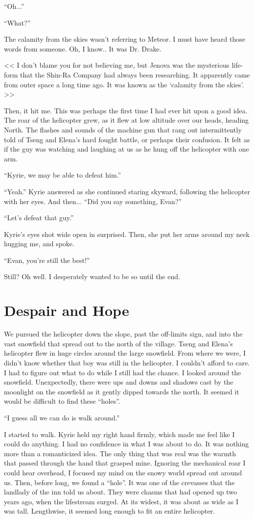 \documentclass[oneside]{book}
\begin{document}
“Oh...”

“What?”

The calamity from the skies wasn’t referring to Meteor. I must have heard those words from someone. Oh, I know.. It was Dr. Drake.

<< I don’t blame you for not believing me, but Jenova was the mysterious life-form that the Shin-Ra Company had always been researching. It apparently came from outer space a long time ago. It was known as the ‘calamity from the skies’. >>

Then, it hit me. This was perhaps the first time I had ever hit upon a good idea. The roar of the helicopter grew, as it flew at low altitude over our heads, heading North. The flashes and sounds of the machine gun that rang out intermittently told of Tseng and Elena’s hard fought battle, or perhaps their confusion. It felt as if the guy was watching and laughing at us as he hung off the helicopter with one arm.

“Kyrie, we may be able to defeat him.”

“Yeah.” Kyrie answered as she continued staring skyward, following the helicopter with her eyes. And then... “Did you say something, Evan?”

“Let’s defeat that guy.”

Kyrie’s eyes shot wide open in surprised. Then, she put her arms around my neck hugging me, and spoke.

“Evan, you’re still the best!”

Still? Oh well. I desperately wanted to be so until the end.

\chapter{Despair and Hope}
We pursued the helicopter down the slope, past the off-limits sign, and into the vast snowfield that spread out to the north of the village. Tseng and Elena’s helicopter flew in huge circles around the large snowfield. From where we were, I didn’t know whether that boy was still in the helicopter. I couldn’t afford to care. I had to figure out what to do while I still had the chance. I looked around the snowfield. Unexpectedly, there were ups and downs and shadows cast by the moonlight on the snowfield as it gently dipped towards the north. It seemed it would be difficult to find these “holes”.

“I guess all we can do is walk around.”

I started to walk. Kyrie held my right hand firmly, which made me feel like I could do anything. I had no confidence in what I was about to do. It was nothing more than a romanticized idea. The only thing that was real was the warmth that passed through the hand that grasped mine. Ignoring the mechanical roar I could hear overhead, I focused my mind on the snowy world spread out around us. Then, before long, we found a “hole”. It was one of the crevasses that the landlady of the inn told us about. They were chasms that had opened up two years ago, when the lifestream surged. At its widest, it was about as wide as I was tall. Lengthwise, it seemed long enough to fit an entire helicopter.
\end{document}
